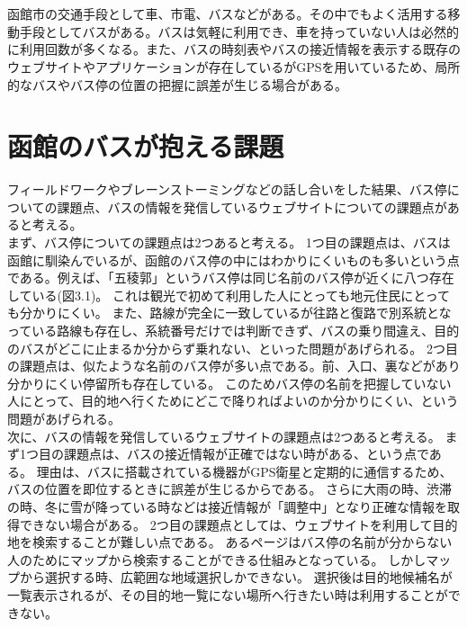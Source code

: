 \documentclass[openany,11pt,papersize]{jsbook}
\begin{document}
\section{}

函館市の交通手段として車、市電、バスなどがある。その中でもよく活用する移動手段としてバスがある。バスは気軽に利用でき、車を持っていない人は必然的に利用回数が多くなる。また、バスの時刻表やバスの接近情報を表示する既存のウェブサイトやアプリケーションが存在しているがGPSを用いているため、局所的なバスやバス停の位置の把握に誤差が生じる場合がある。


\section{函館のバスが抱える課題}

フィールドワークやブレーンストーミングなどの話し合いをした結果、バス停についての課題点、バスの情報を発信しているウェブサイトについての課題点があると考える。\\
まず、バス停についての課題点は2つあると考える。
1つ目の課題点は、バスは函館に馴染んでいるが、函館のバス停の中にはわかりにくいものも多いという点である。例えば、「五稜郭」というバス停は同じ名前のバス停が近くに八つ存在している(図3.1)。
これは観光で初めて利用した人にとっても地元住民にとっても分かりにくい。
また、路線が完全に一致しているが往路と復路で別系統となっている路線も存在し、系統番号だけでは判断できず、バスの乗り間違え、目的のバスがどこに止まるか分からず乗れない、といった問題があげられる。
2つ目の課題点は、似たような名前のバス停が多い点である。前、入口、裏などがあり分かりにくい停留所も存在している。
このためバス停の名前を把握していない人にとって、目的地へ行くためにどこで降りればよいのか分かりにくい、という問題があげられる。\\
次に、バスの情報を発信しているウェブサイトの課題点は2つあると考える。
まず1つ目の課題点は、バスの接近情報が正確ではない時がある、という点である。
理由は、バスに搭載されている機器がGPS衛星と定期的に通信するため、バスの位置を即位するときに誤差が生じるからである。
さらに大雨の時、渋滞の時、冬に雪が降っている時などは接近情報が「調整中」となり正確な情報を取得できない場合がある。
2つ目の課題点としては、ウェブサイトを利用して目的地を検索することが難しい点である。
あるページはバス停の名前が分からない人のためにマップから検索することができる仕組みとなっている。
しかしマップから選択する時、広範囲な地域選択しかできない。
選択後は目的地候補名が一覧表示されるが、その目的地一覧にない場所へ行きたい時は利用することができない。
\end{document}
